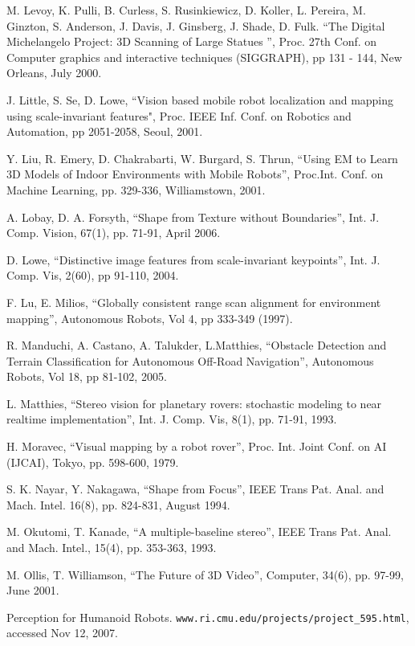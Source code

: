 \documentclass[twocolumn,oneside]{book}
\begin{document}
\begin{thebibliography}{99}
M. Levoy, K. Pulli, B. Curless, S. Rusinkiewicz, D. Koller, L. Pereira, M. Ginzton, S. Anderson, J. Davis, J. Ginsberg, J. Shade, D. Fulk.
``The Digital Michelangelo Project: 3D Scanning of Large Statues '',
Proc. 27th Conf. on Computer graphics and interactive techniques
(SIGGRAPH), pp 131 - 144, New Orleans, July 2000.

J. Little, S. Se, D. Lowe,
``Vision based mobile robot localization and mapping using scale-invariant features",
Proc. IEEE Inf. Conf. on Robotics and Automation, pp 2051-2058, Seoul, 2001.

Y. Liu, R. Emery, D. Chakrabarti, W. Burgard, S. Thrun, 
``Using EM to Learn 3D Models of Indoor Environments with Mobile
Robots'', 
Proc.Int. Conf. on Machine Learning, pp. 329-336, Williamstown, 2001.

A. Lobay, D. A. Forsyth, 
``Shape from Texture without Boundaries'',
Int. J. Comp. Vision, 67(1), pp. 71-91, April 2006.

D. Lowe, 
``Distinctive image features from scale-invariant keypoints'',
Int. J. Comp. Vis, 2(60), pp 91-110, 2004.

F. Lu, E. Milios,
``Globally consistent range scan alignment for environment mapping'',
Autonomous Robots, Vol 4, pp 333-349 (1997).

R. Manduchi, A. Castano, A. Talukder, L.Matthies,
``Obstacle Detection and Terrain Classification for Autonomous Off-Road Navigation'',
Autonomous Robots, Vol 18, pp 81-102, 2005.

L. Matthies,
``Stereo vision for planetary rovers: stochastic
modeling to near realtime implementation'',
Int. J. Comp. Vis,  8(1), pp. 71-91, 1993.

H. Moravec, 
``Visual mapping by a robot rover'',
Proc. Int. Joint Conf. on AI (IJCAI), Tokyo, pp. 598-600, 1979.

S. K. Nayar, Y. Nakagawa, 
``Shape from Focus'',
IEEE Trans Pat. Anal. and Mach. Intel. 16(8), pp. 824-831, August 1994.

M. Okutomi, T. Kanade,
``A multiple-baseline stereo'',
IEEE Trans Pat. Anal. and Mach. Intel., 15(4), pp. 353-363, 1993.

M. Ollis, T. Williamson,
``The Future of 3D Video'', Computer, 34(6), pp. 97-99, June 2001.

Perception for Humanoid Robots.
\verb+www.ri.cmu.edu/projects/project_595.html+, accessed Nov 12, 2007.


\end{thebibliography}
\end{document}
